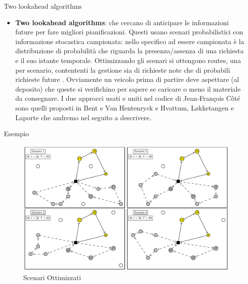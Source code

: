 \documentclass[10pt]{beamer}
\begin{document}
    \begin{frame}{Two lookahead algorithms}
        \begin{itemize}
            \item \textbf{Two lookahead algorithms}: che cercano di anticipare le informazioni future per fare migliori pianificazioni. Questi usano scenari probabilistici con informazione stocastica campionata: nello specifico ad essere campionata è la distribuzione di probabilità che riguarda la presenza/assenza di una richiesta e il suo istante temporale. Ottimizzando gli scenari si ottengono routes, una per scenario, contententi la gestione sia di richieste note che di probabili richieste future . Ovviamente un veicolo prima di partire deve aspettare (al deposito) che queste si verifichino per sapere se caricare o meno il materiale da consegnare. I due approcci usati e uniti nel codice di Jean-François Côté sono quelli proposti in Bent e Van Hentenryck\cite{SBPPDVR} e Hvattum, Løkketangen e Laporte \cite{BRH} che andremo nel seguito a descrivere.
        \end{itemize}
    \end{frame}

  \begin{frame}{Esempio}
        \begin{figure}[h!]
            \centering
            \includegraphics[scale=0.3]{Images/OptimizedScenario.png}
            \caption{Scenari Ottimizzati}
            \label{fig:optimizedScenario}
        \end{figure}
  \end{frame}
\end{document}
